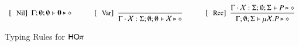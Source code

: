\begin{figure}[!t]
\[\begin{array}{c}
		\trule{Nil}~~\Gamma; \emptyset; \emptyset \proves \inact \hastype \Proc
\qquad \quad
		\trule{Var}~~\tree{
	
		}{
			\Gamma \cat \rvar{X}: \Sigma; \emptyset; \emptyset  \proves \rvar{X} \hastype \Proc
		}
		\qquad\quad 

	 	\trule{Rec}~~\tree{
			\Gamma \cat \rvar{X}: \Sigma; \emptyset; \Sigma  \proves P \hastype \Proc
		}{
			\Gamma ; \emptyset; \Sigma  \proves \recp{X}{P} \hastype \Proc
		}


	\end{array}
\]
\caption{Typing Rules for $\mathsf{HO}\pi$\label{fig:typerulesmy}}
\end{figure}
